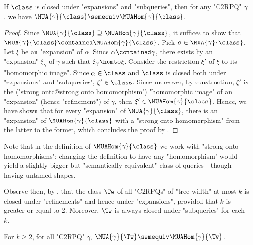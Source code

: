 \begin{fact}
    \AP\label{obs:equivalence_under_approx_homomorphism}
    If $\class$ is closed under "expansions" and "subqueries",
	then for any "C2RPQ" $\gamma$, we have $\MUA{\gamma}{\class} \semequiv \MUAHom{\gamma}{\class}$.
\end{fact}
\begin{proof}
	Since $\MUA{\gamma}{\class} \supseteq \MUAHom{\gamma}{\class}$,
	it suffices to show that $\MUA{\gamma}{\class} \contained \MUAHom{\gamma}{\class}$.
	Pick $\alpha \in \MUA{\gamma}{\class}$. Let $\xi$ be an "expansion" of $\alpha$. 
	Since $\alpha \contained \gamma$, there exists by 
	an "expansion" $\xi_\gamma$ of $\gamma$ such that $\xi_\gamma \homto \xi$. 
	Consider the restriction $\xi'$ of $\xi$ to its "homomorphic image".
	Since $\alpha \in \class$ and $\class$ is closed both under "expansions" and "subqueries",
	$\xi' \in \class$. Since moreover, by construction, $\xi'$ is the ("strong onto@strong onto homomorphism") "homomorphic image"
	of an "expansion" (hence "refinement") of $\gamma$, then $\xi' \in \MUAHom{\gamma}{\class}$.
	Hence, we have shown that for every "expansion" of $\MUA{\gamma}{\class}$,
	there is an "expansion" of $\MUAHom{\gamma}{\class}$ with a "strong onto homomorphism" from the
	latter to the former, which concludes the proof by .
\end{proof}

Note that
in the definition of $\MUAHom{\gamma}{\class}$ we work with "strong onto homomorphisms":
changing the definition to have any "homomorphism" would yield a slightly bigger but "semantically equivalent" class of queries---though having untamed shapes.

Observe then, by , that the class $\Tw$ of all "C2RPQs" of "tree-width" at 
most $k$ is closed under "refinements" and hence under "expansions", provided that $k$ is greater 
or equal to 2. Moreover, $\Tw$ is always closed under "subqueries" for each $k$.

\begin{corollary}
    \AP\label{coro:equivalence_under_approx_homomorphism_twk}
    For $k \geq 2$, for all "C2RPQ" $\gamma$,
    $\MUA{\gamma}{\Tw} \semequiv \MUAHom{\gamma}{\Tw}$.
\end{corollary}

